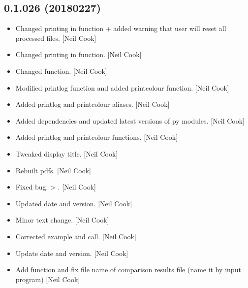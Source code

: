 \documentclass[a4paper,10pt,english]{report}
\begin{document}
\subsection{0.1.026 (2018\sphinxhyphen{}02\sphinxhyphen{}27)}
\label{\detokenize{misc/changelog:id496}}\begin{itemize}
\item {} 
Changed printing in function + added warning that user will reset all
processed files. {[}Neil Cook{]}

\item {} 
Changed printing in function. {[}Neil Cook{]}

\item {} 
Changed  function. {[}Neil Cook{]}

\item {} 
Modified printlog function and added printcolour function. {[}Neil Cook{]}

\item {} 
Added printlog and printcolour aliases. {[}Neil Cook{]}

\item {} 
Added dependencies and updated latest versions of py modules. {[}Neil
Cook{]}

\item {} 
Added printlog and printcolour functions. {[}Neil Cook{]}

\item {} 
Tweaked display title. {[}Neil Cook{]}

\item {} 
Rebuilt pdfs. {[}Neil Cook{]}

\item {} 
Fixed bug:  \sphinxhyphen{}\textgreater{} . {[}Neil Cook{]}

\item {} 
Updated date and version. {[}Neil Cook{]}

\item {} 
Minor text change. {[}Neil Cook{]}

\item {} 
Corrected  example and call. {[}Neil Cook{]}

\item {} 
Update date and version. {[}Neil Cook{]}

\item {} 
Add  function and fix file name of comparison results
file (name it by input program) {[}Neil Cook{]}


\end{itemize}
\end{document}
